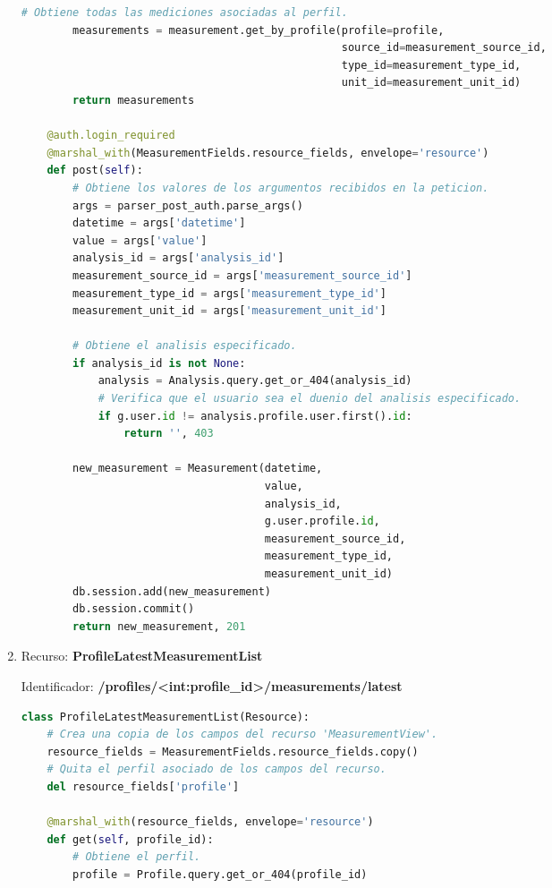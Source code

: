 \documentclass[a4paper,12pt]{article}
\begin{document}
\begin{enumerate}
\begin{lstlisting}[language=Python]
        # Obtiene todas las mediciones asociadas al perfil.
        measurements = measurement.get_by_profile(profile=profile,
                                                  source_id=measurement_source_id,
                                                  type_id=measurement_type_id,
                                                  unit_id=measurement_unit_id)
        return measurements

    @auth.login_required
    @marshal_with(MeasurementFields.resource_fields, envelope='resource')
    def post(self):
        # Obtiene los valores de los argumentos recibidos en la peticion.
        args = parser_post_auth.parse_args()
        datetime = args['datetime']
        value = args['value']
        analysis_id = args['analysis_id']
        measurement_source_id = args['measurement_source_id']
        measurement_type_id = args['measurement_type_id']
        measurement_unit_id = args['measurement_unit_id']

        # Obtiene el analisis especificado.
        if analysis_id is not None:
            analysis = Analysis.query.get_or_404(analysis_id)
            # Verifica que el usuario sea el duenio del analisis especificado.
            if g.user.id != analysis.profile.user.first().id:
                return '', 403

        new_measurement = Measurement(datetime,
                                      value,
                                      analysis_id,
                                      g.user.profile.id,
                                      measurement_source_id,
                                      measurement_type_id,
                                      measurement_unit_id)
        db.session.add(new_measurement)
        db.session.commit()
        return new_measurement, 201
\end{lstlisting}

\item Recurso: \textbf{ProfileLatestMeasurementList}

Identificador: \textbf{/profiles/<int:profile\_id>/measurements/latest}

\begin{lstlisting}[language=Python]
class ProfileLatestMeasurementList(Resource):
    # Crea una copia de los campos del recurso 'MeasurementView'.
    resource_fields = MeasurementFields.resource_fields.copy()
    # Quita el perfil asociado de los campos del recurso.
    del resource_fields['profile']

    @marshal_with(resource_fields, envelope='resource')
    def get(self, profile_id):
        # Obtiene el perfil.
        profile = Profile.query.get_or_404(profile_id)


\end{lstlisting}
\end{enumerate}
\end{document}
